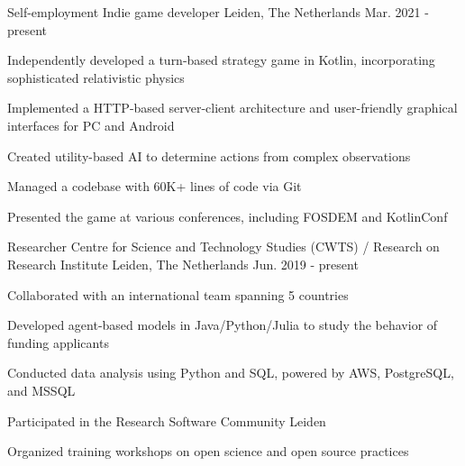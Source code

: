 

\begin{cventries}

  \cventry
    {Self-employment} %
    {Indie game developer} %
    {Leiden, The Netherlands} %
    {Mar. 2021 - present} %
    {
      \begin{cvitems} %
        \item{Independently developed a turn-based strategy game in Kotlin, incorporating sophisticated relativistic physics}
        \item{Implemented a HTTP-based server-client architecture and user-friendly graphical interfaces for PC and Android}
        \item{Created utility-based AI to determine actions from complex observations}
        \item{Managed a codebase with 60K+ lines of code via Git}
        \item{Presented the game at various conferences, including FOSDEM and KotlinConf}
      \end{cvitems}
    }

  \cventry
    {Researcher} %
    {Centre for Science and Technology Studies (CWTS) / Research on Research Institute} %
    {Leiden, The Netherlands} %
    {Jun. 2019 - present} %
    {
      \begin{cvitems} %
        \item{Collaborated with an international team spanning 5 countries}
        \item{Developed agent-based models in Java/Python/Julia to study the behavior of funding applicants}
        \item{Conducted data analysis using Python and SQL, powered by AWS, PostgreSQL, and MSSQL}
        \item{Participated in the Research Software Community Leiden}
        \item{Organized training workshops on open science and open source practices}
      \end{cvitems}
    }



\end{cventries}

